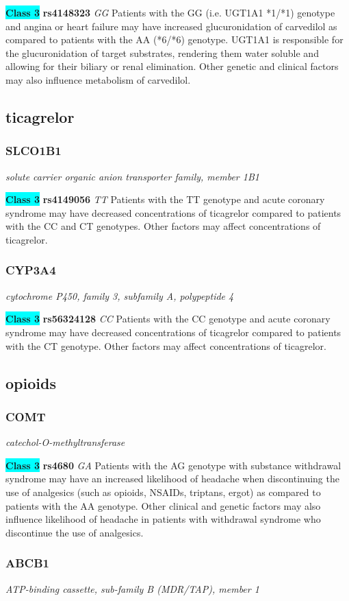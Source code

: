 \documentclass{report}
\begin{document}
\textbf{\colorbox{cyan} {Class 3}} \textbf{ rs4148323 } \textit{ GG }
Patients with the GG (i.e. UGT1A1 *1/*1) genotype and angina or heart failure may have increased glucuronidation of carvedilol as compared to patients with the AA (*6/*6) genotype. UGT1A1 is responsible for the glucuronidation of target substrates, rendering them water soluble and allowing for their biliary or renal elimination. Other genetic and clinical factors may also influence metabolism of carvedilol.\newline\subsection{ ticagrelor }\subsubsection{ SLCO1B1 }
\textit{ solute carrier organic anion transporter family, member 1B1 }

\textbf{\colorbox{cyan} {Class 3}} \textbf{ rs4149056 } \textit{ TT }
Patients with the TT genotype and acute coronary syndrome may have decreased concentrations of ticagrelor compared to patients with the CC and CT genotypes. Other factors may affect concentrations of ticagrelor.\newline\subsubsection{ CYP3A4 }
\textit{ cytochrome P450, family 3, subfamily A, polypeptide 4 }

\textbf{\colorbox{cyan} {Class 3}} \textbf{ rs56324128 } \textit{ CC }
Patients with the CC genotype and acute coronary syndrome may have decreased concentrations of ticagrelor compared to patients with the CT genotype. Other factors may affect concentrations of ticagrelor.\newline\subsection{ opioids }\subsubsection{ COMT }
\textit{ catechol-O-methyltransferase }

\textbf{\colorbox{cyan} {Class 3}} \textbf{ rs4680 } \textit{ GA }
Patients with the AG genotype with substance withdrawal syndrome may have an increased likelihood of headache when discontinuing the use of analgesics (such as opioids, NSAIDs, triptans, ergot) as compared to patients with the AA genotype. Other clinical and genetic factors may also influence likelihood of headache in patients with withdrawal syndrome who discontinue the use of analgesics.\newline\subsubsection{ ABCB1 }
\textit{ ATP-binding cassette, sub-family B (MDR/TAP), member 1 }
\end{document}
